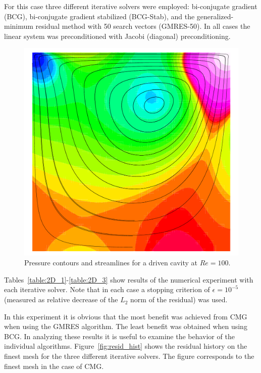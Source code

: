 For this case three different iterative solvers were employed: bi-conjugate gradient (BCG), bi-conjugate gradient stabilized (BCG-Stab), and the generalized-minimum residual method with 50 search vectors (GMRES-50).  In all cases the linear system was preconditioned with Jacobi (diagonal) preconditioning.
\begin{figure}[hbt]
  \begin{center}
    \includegraphics[width=.4\textwidth]{figures/cmg/flowfield-2D}
    \caption{Pressure contours and streamlines for a driven cavity at $Re=100$.}
    \label{fig:2D}
  \end{center}
\end{figure}


Tables~\ref{table:2D_1}-\ref{table:2D_3} show results of the numerical experiment with each iterative solver.  Note that in each case a stopping criterion of $\epsilon=10^{-5}$ (measured as relative decrease of the $L_2$ norm of the residual) was used.

In this experiment it is obvious that the most benefit was achieved from CMG when using the GMRES algorithm.  The least benefit was obtained when using BCG.  In analyzing these results it is useful to examine the behavior of the individual algorithms. Figure~\ref{fig:resid_hist} shows the residual history on the finest mesh for the three different iterative solvers. The figure corresponds to the finest mesh in the case of CMG.
    
